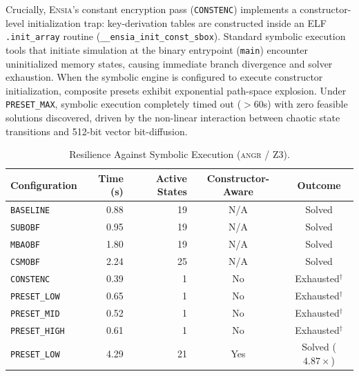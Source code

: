 \documentclass[conference]{IEEEtran}
\begin{document}
Crucially, \textsc{Ensia}'s constant encryption pass (\texttt{CONSTENC}) implements a constructor-level initialization trap: key-derivation tables are constructed inside an ELF \texttt{.init\_array} routine (\texttt{\_\_ensia\_init\_const\_sbox}). Standard symbolic execution tools that initiate simulation at the binary entrypoint (\texttt{main}) encounter uninitialized memory states, causing immediate branch divergence and solver exhaustion. When the symbolic engine is configured to execute constructor initialization, composite presets exhibit exponential path-space explosion. Under \texttt{PRESET\_MAX}, symbolic execution completely timed out ($>60$s) with zero feasible solutions discovered, driven by the non-linear interaction between chaotic state transitions and 512-bit vector bit-diffusion.

\begin{table}[h]
\centering
\caption{Resilience Against Symbolic Execution (\textsc{angr} / Z3).}
\label{tab:symbolic_resilience}
\begin{tabular}{lrrcc}
\toprule
\textbf{Configuration} & \textbf{Time (s)} & \textbf{Active States} & \textbf{Constructor-Aware} & \textbf{Outcome} \\
\midrule
\texttt{BASELINE}      & 0.88              & 19                     & N/A                        & Solved \\
\texttt{SUBOBF}        & 0.95              & 19                     & N/A                        & Solved \\
\texttt{MBAOBF}        & 1.80              & 19                     & N/A                        & Solved \\
\texttt{CSMOBF}        & 2.24              & 25                     & N/A                        & Solved \\
\texttt{CONSTENC}      & 0.39              & 1                      & No                         & Exhausted$^\dagger$ \\
\texttt{PRESET\_LOW}   & 0.65              & 1                      & No                         & Exhausted$^\dagger$ \\
\texttt{PRESET\_MID}   & 0.52              & 1                      & No                         & Exhausted$^\dagger$ \\
\texttt{PRESET\_HIGH}  & 0.61              & 1                      & No                         & Exhausted$^\dagger$ \\
\midrule
\texttt{PRESET\_LOW}   & 4.29              & 21                     & Yes                        & Solved ($4.87\times$) \\

\end{tabular}
\end{table}
\end{document}
